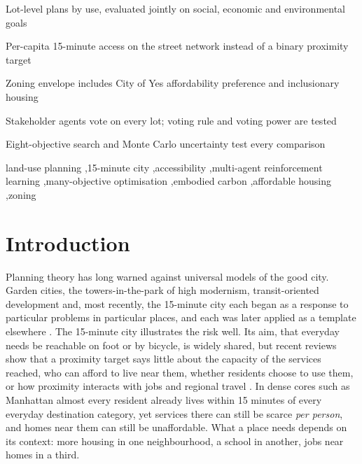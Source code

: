 \documentclass[preprint,12pt]{elsarticle}
\begin{document}
\begin{frontmatter}
\begin{abstract}
area and the plan's size in every seed without restoring per-capita access. Most rankings are robust to the uncertain parameters tested. Every number is regenerated from public data by one command.
\end{abstract}

\begin{highlights}
\item Lot-level plans by use, evaluated jointly on social, economic and environmental goals
\item Per-capita 15-minute access on the street network instead of a binary proximity target
\item Zoning envelope includes City of Yes affordability preference and inclusionary housing
\item Stakeholder agents vote on every lot; voting rule and voting power are tested
\item Eight-objective search and Monte Carlo uncertainty test every comparison
\end{highlights}

\begin{keyword}
land-use planning \sep 15-minute city \sep accessibility \sep multi-agent reinforcement learning \sep many-objective optimisation \sep embodied carbon \sep affordable housing \sep zoning
\end{keyword}

\end{frontmatter}

\linenumbers

\section{Introduction}

Planning theory has long warned against universal models of the good city. Garden cities, the towers-in-the-park of high modernism, transit-oriented development and, most recently, the 15-minute city \cite{moreno2021fifteen} each began as a response to particular problems in particular places, and each was later applied as a template elsewhere \cite{scott1998seeing}. The 15-minute city illustrates the risk well. Its aim, that everyday needs be reachable on foot or by bicycle, is widely shared, but recent reviews show that a proximity target says little about the capacity of the services reached, who can afford to live near them, whether residents choose to use them, or how proximity interacts with jobs and regional travel \cite{mouratidis2024time,mahmoudpour2026critical}. In dense cores such as Manhattan almost every resident already lives within 15 minutes of every everyday destination category, yet services there can still be scarce \emph{per person}, and homes near them can still be unaffordable. What a place needs depends on its context: more housing in one neighbourhood, a school in another, jobs near homes in a third.
\end{document}
